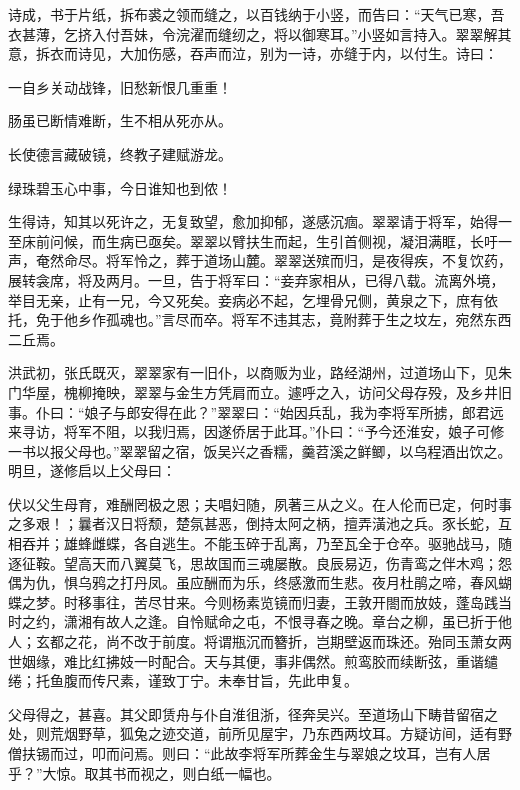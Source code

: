 \documentclass[a4paper,12pt,UTF8,twoside]{ctexbook}
\begin{document}
诗成，书于片纸，拆布裘之领而缝之，以百钱纳于小竖，而告曰：“天气已寒，吾衣甚薄，乞挤入付吾妹，令浣濯而缝纫之，将以御寒耳。”小竖如言持入。翠翠解其意，拆衣而诗见，大加伤感，吞声而泣，别为一诗，亦缝于内，以付生。诗曰：

一自乡关动战锋，旧愁新恨几重重！

肠虽已断情难断，生不相从死亦从。

长使德言藏破镜，终教子建赋游龙。

绿珠碧玉心中事，今日谁知也到侬！

生得诗，知其以死许之，无复致望，愈加抑郁，遂感沉痼。翠翠请于将军，始得一至床前问候，而生病已亟矣。翠翠以臂扶生而起，生引首侧视，凝泪满眶，长吁一声，奄然命尽。将军怜之，葬于道场山麓。翠翠送殡而归，是夜得疾，不复饮药，展转衾席，将及两月。一旦，告于将军曰：“妾弃家相从，已得八载。流离外境，举目无亲，止有一兄，今又死矣。妾病必不起，乞埋骨兄侧，黄泉之下，庶有依托，免于他乡作孤魂也。”言尽而卒。将军不违其志，竟附葬于生之坟左，宛然东西二丘焉。

洪武初，张氏既灭，翠翠家有一旧仆，以商贩为业，路经湖州，过道场山下，见朱门华屋，槐柳掩映，翠翠与金生方凭肩而立。遽呼之入，访问父母存殁，及乡井旧事。仆曰：“娘子与郎安得在此？”翠翠曰：“始因兵乱，我为李将军所掳，郎君远来寻访，将军不阻，以我归焉，因遂侨居于此耳。”仆曰：“予今还淮安，娘子可修一书以报父母也。”翠翠留之宿，饭吴兴之香糯，羹苕溪之鲜鲫，以乌程酒出饮之。明旦，遂修启以上父母曰：

伏以父生母育，难酬罔极之恩；夫唱妇随，夙著三从之义。在人伦而已定，何时事之多艰！；曩者汉日将颓，楚氛甚恶，倒持太阿之柄，擅弄潢池之兵。豕长蛇，互相吞并；雄蜂雌蝶，各自逃生。不能玉碎于乱离，乃至瓦全于仓卒。驱驰战马，随逐征鞍。望高天而八翼莫飞，思故国而三魂屡散。良辰易迈，伤青鸾之伴木鸡；怨偶为仇，惧乌鸦之打丹凤。虽应酬而为乐，终感激而生悲。夜月杜鹃之啼，春风蝴蝶之梦。时移事往，苦尽甘来。今则杨素览镜而归妻，王敦开閤而放妓，蓬岛践当时之约，潇湘有故人之逢。自怜赋命之屯，不恨寻春之晚。章台之柳，虽已折于他人；玄都之花，尚不改于前度。将谓瓶沉而簪折，岂期壁返而珠还。殆同玉萧女两世姻缘，难比红拂妓一时配合。天与其便，事非偶然。煎鸾胶而续断弦，重谐缱绻；托鱼腹而传尺素，谨致丁宁。未奉甘旨，先此申复。

父母得之，甚喜。其父即赁舟与仆自淮徂浙，径奔吴兴。至道场山下畴昔留宿之处，则荒烟野草，狐兔之迹交道，前所见屋宇，乃东西两坟耳。方疑访间，适有野僧扶锡而过，叩而问焉。则曰：“此故李将军所葬金生与翠娘之坟耳，岂有人居乎？”大惊。取其书而视之，则白纸一幅也。
\end{document}
